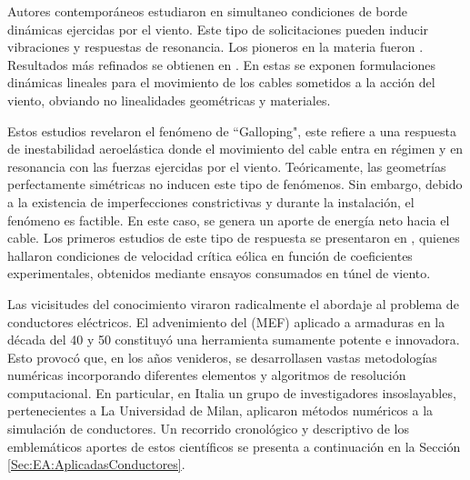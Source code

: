 Autores contemporáneos estudiaron en simultaneo condiciones de borde dinámicas ejercidas por el viento. Este tipo de solicitaciones pueden inducir vibraciones y respuestas de resonancia. Los pioneros en la materia fueron \cite{Davenport1965}. Resultados más refinados se obtienen en \cite{Starossek1991}. En estas se exponen formulaciones dinámicas lineales para el movimiento de los cables sometidos a la acción del viento, obviando no linealidades geométricas y materiales. 

Estos estudios revelaron el fenómeno de ``Galloping", este refiere a una respuesta de inestabilidad aeroelástica donde el movimiento del cable entra en régimen y en resonancia con las fuerzas ejercidas por el viento. Teóricamente, las geometrías perfectamente simétricas no inducen este tipo de fenómenos. Sin embargo, debido a la existencia de imperfecciones constrictivas y durante la instalación, el fenómeno es factible. En este caso, se genera un aporte de energía neto hacia el cable. Los primeros estudios de este tipo de respuesta se presentaron en \citep{Simiu1986}, quienes hallaron condiciones de velocidad crítica eólica en función de coeficientes experimentales, obtenidos mediante ensayos consumados en túnel de viento. 

Las vicisitudes del conocimiento viraron radicalmente el abordaje al problema de conductores eléctricos. El advenimiento del (\gls{MEF}) aplicado a armaduras en la década del 40 y 50 constituyó una herramienta sumamente potente e innovadora. Esto provocó que, en los años venideros, se desarrollasen vastas metodologías numéricas incorporando diferentes elementos y algoritmos de resolución computacional. En particular, en Italia un grupo de investigadores insoslayables, pertenecientes a La Universidad de Milan, aplicaron métodos numéricos a la simulación de conductores. Un recorrido cronológico y descriptivo de los emblemáticos aportes de estos científicos se presenta a continuación en la Sección \ref{Sec:EA:AplicadasConductores}.

